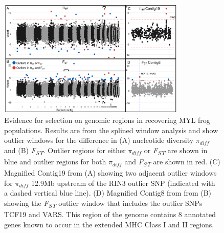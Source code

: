 \documentclass[9pt,twocolumn,twoside,lineno]{pnas-new}
\begin{document}
\begin{figure}

{\centering \includegraphics[width=0.8\textwidth]{figures/splinewindow_manhattan.png}

}

\caption{\label{fig-spline-manhattan}Evidence for selection on genomic
regions in recovering MYL frog populations. Results are from the splined
window analysis and show outlier windows for the difference in (A)
nucleotide diversity \(\pi_{diff}\) and (B) \emph{F\textsubscript{ST}}.
Outlier regions for either \(\pi_{diff}\) or \emph{F\textsubscript{ST}}
are shown in blue and outlier regions for both \(\pi_{diff}\) and
\emph{F\textsubscript{ST}} are shown in red. (C) Magnified Contig19 from
(A) showing two adjacent outlier windows for \(\pi_{diff}\) 12.9Mb
upstream of the RIN3 outlier SNP (indicated with a dashed vertical blue
line). (D) Magnified Contig8 from from (B) showing the
\emph{F\textsubscript{ST}} outlier window that includes the outlier SNPs
TCF19 and VARS. This region of the genome contains 8 annotated genes
known to occur in the extended MHC Class I and II regions.}

\end{figure}

\newpage
\end{document}
